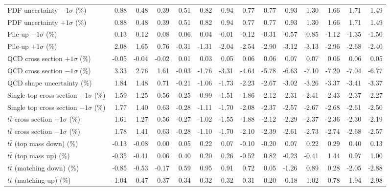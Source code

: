 \begin{table}[htbp]
{\begin{tabular}{lrrrrrrrrrrrrr}
PDF uncertainty $-1\sigma$ (\%) & 0.88 & 0.48 & 0.39 & 0.51 & 0.82 & 0.94 & 0.77 & 0.77 & 0.93 & 1.30 & 1.66 & 1.71 & 1.49 \\ 
PDF uncertainty $+1\sigma$ (\%) & 0.88 & 0.48 & 0.39 & 0.51 & 0.82 & 0.94 & 0.77 & 0.77 & 0.93 & 1.30 & 1.66 & 1.71 & 1.49 \\ 
Pile-up $-1\sigma$ (\%) & 0.13 & 0.12 & 0.08 & 0.06 & 0.04 & -0.01 & -0.12 & -0.31 & -0.57 & -0.85 & -1.12 & -1.35 & -1.50 \\ 
Pile-up $+1\sigma$ (\%) & 2.08 & 1.65 & 0.76 & -0.31 & -1.31 & -2.04 & -2.54 & -2.90 & -3.12 & -3.13 & -2.96 & -2.68 & -2.40 \\ 
QCD cross section \ensuremath{+1\sigma} (\%) & -0.05 & -0.04 & -0.02 & 0.01 & 0.03 & 0.05 & 0.06 & 0.06 & 0.07 & 0.07 & 0.06 & 0.06 & 0.05 \\ 
QCD cross section \ensuremath{-1\sigma} (\%) & 3.33 & 2.76 & 1.61 & -0.03 & -1.76 & -3.31 & -4.64 & -5.78 & -6.63 & -7.10 & -7.20 & -7.04 & -6.77 \\ 
QCD shape uncertainty (\%) & 1.84 & 1.48 & 0.71 & -0.21 & -1.06 & -1.73 & -2.23 & -2.67 & -3.02 & -3.26 & -3.37 & -3.41 & -3.37 \\ 
Single top cross section $+1\sigma$ (\%) & 1.59 & 1.25 & 0.56 & -0.25 & -0.99 & -1.51 & -1.86 & -2.12 & -2.31 & -2.41 & -2.43 & -2.37 & -2.27 \\ 
Single top cross section $-1\sigma$ (\%) & 1.77 & 1.40 & 0.63 & -0.28 & -1.11 & -1.70 & -2.08 & -2.37 & -2.57 & -2.67 & -2.68 & -2.61 & -2.50 \\ 
$t\bar{t}$ cross section $+1\sigma$ (\%) & 1.61 & 1.27 & 0.56 & -0.27 & -1.02 & -1.55 & -1.88 & -2.12 & -2.29 & -2.37 & -2.36 & -2.30 & -2.19 \\ 
$t\bar{t}$ cross section $-1\sigma$ (\%) & 1.78 & 1.41 & 0.63 & -0.28 & -1.10 & -1.70 & -2.10 & -2.39 & -2.61 & -2.73 & -2.74 & -2.68 & -2.57 \\ 
$t\bar{t}$ (top mass down) (\%) & -0.13 & -0.08 & 0.00 & 0.05 & 0.22 & 0.07 & -0.10 & -0.20 & 0.07 & 0.22 & 0.29 & 0.40 & 0.13 \\ 
$t\bar{t}$ (top mass up) (\%) & -0.35 & -0.41 & 0.06 & 0.40 & 0.20 & 0.26 & -0.52 & 0.82 & -0.23 & -0.41 & 1.44 & 0.97 & 1.00 \\ 
$t\bar{t}$ (matching down) (\%) & -0.85 & -0.53 & -0.17 & 0.59 & 0.95 & 0.91 & 0.72 & 0.05 & -1.26 & 0.89 & 0.28 & -2.05 & -2.88 \\ 
$t\bar{t}$ (matching up) (\%) & -1.04 & -0.47 & 0.37 & 0.34 & 0.32 & 0.32 & 0.31 & 0.20 & 0.18 & 1.02 & 0.78 & 1.94 & 2.98 \\ 

\end{tabular}}
\end{table}
